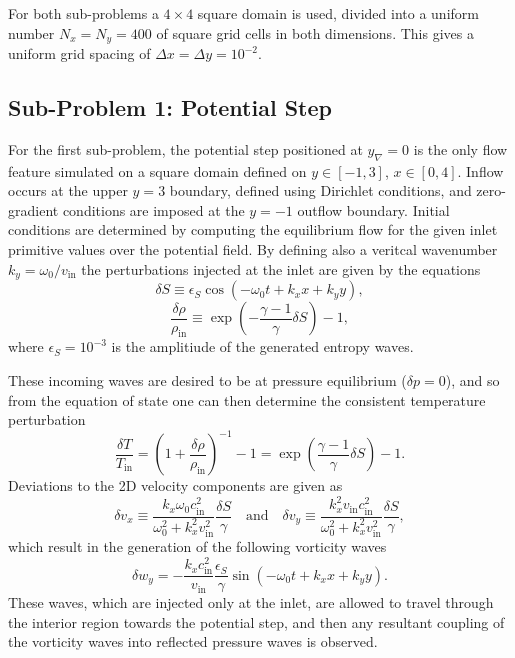For both sub-problems a $4\times4$ square domain is used, divided into a uniform number $N_x=N_y=400$ of square grid cells in both dimensions. This gives a uniform grid spacing of $\Delta x=\Delta y=10^{-2}$.

\subsection{Sub-Problem 1: Potential Step}
\label{subsec:sub_problem_1}

For the first sub-problem, the potential step positioned at $y_\nabla=0$ is the only flow feature simulated on a square domain defined on $y\in[-1,3]$, $x\in[0,4]$. Inflow occurs at the upper $y=3$ boundary, defined using Dirichlet conditions, and zero-gradient conditions are imposed at the $y=-1$ outflow boundary. Initial conditions are determined by computing the equilibrium flow for the given inlet primitive values over the potential field. By defining also a veritcal wavenumber $k_y=\omega_0/v_\textrm{in}$ the perturbations injected at the inlet are given by the equations
\begin{equation}
\delta S\equiv\epsilon_S\cos\left(-\omega_0t+k_xx+k_yy\right),
\end{equation}
\begin{equation}
\frac{\delta \rho}{\rho_\textrm{in}}\equiv\exp\left(-\frac{\gamma-1}{\gamma}\delta S\right)-1,
\end{equation}
where $\epsilon_S=10^{-3}$ is the amplitiude of the generated entropy waves.

These incoming waves are desired to be at pressure equilibrium ($\delta p=0$), and so from the equation of state one can then determine the consistent temperature perturbation
\begin{equation}
\frac{\delta T}{T_\textrm{in}}=\left(1+\frac{\delta\rho}{\rho_\textrm{in}}\right)^{-1}-1=\exp\left(\frac{\gamma-1}{\gamma}\delta S\right)-1.
\end{equation}
Deviations to the 2D velocity components are given as
\begin{equation}
\delta v_x\equiv\frac{k_x\omega_0c_\textrm{in}^2}{\omega_0^2+k_x^2v_\textrm{in}^2}\frac{\delta S}{\gamma} \quad \textrm{and} \quad \delta v_y\equiv\frac{k_x^2v_\textrm{in}c_\textrm{in}^2}{\omega_0^2+k_x^2v_\textrm{in}^2}\frac{\delta S}{\gamma},
\end{equation}
which result in the generation of the following vorticity waves 
\begin{equation}
\delta w_y=-\frac{k_xc_\textrm{in}^2}{v_\textrm{in}}\frac{\epsilon_S}{\gamma}\sin\left(-\omega_0t+k_xx+k_yy\right).
\end{equation}
These waves, which are injected only at the inlet, are allowed to travel through the interior region towards the potential step, and then any resultant coupling of the vorticity waves into reflected pressure waves is observed.

